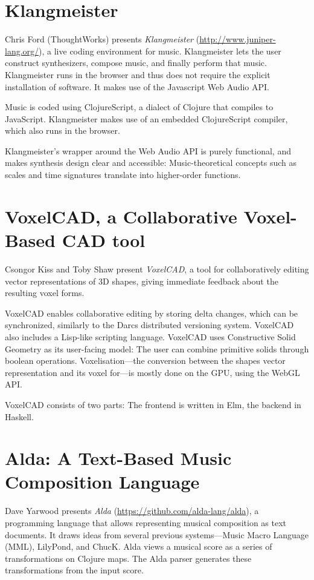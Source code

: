\documentclass{sigplanconf}
\begin{document}
\section{Klangmeister}

Chris Ford (ThoughtWorks) presents \textit{Klangmeister} (\url{http://www.juniper-lang.org/}), a live
coding environment for music.  Klangmeister lets the user construct
synthesizers, compose music, and finally perform that music.
Klangmeister runs in the browser and thus does not require the
explicit installation of software.  It makes use of the Javascript Web
Audio API.

Music is coded using ClojureScript, a dialect of Clojure that
compiles to JavaScript.  Klangmeister makes use of 
an embedded ClojureScript compiler, which also runs in the
browser.

Klangmeister's wrapper around the Web Audio API is purely functional,
and makes synthesis design clear and accessible:  Music-theoretical
concepts such as scales and time signatures translate into
higher-order functions.

\section{VoxelCAD, a Collaborative Voxel-Based CAD tool}

Csongor Kiss and Toby Shaw present \textit{VoxelCAD}, a tool for
collaboratively editing vector representations of 3D shapes, giving
immediate feedback about the resulting voxel forms.

VoxelCAD enables collaborative editing by storing delta chan\-ges, which
can be synchronized, similarly to the Darcs distributed versioning
system.  VoxelCAD also includes a Lisp-like scripting language.
VoxelCAD uses Constructive Solid Geometry as its user-facing model:
The user can combine primitive solids through boolean operations.
Voxelisation---the conversion between the shapes vector representation
and its voxel for---is mostly done on the GPU, using the WebGL API.

VoxelCAD consists of two parts: The frontend is written in Elm, the
backend in Haskell.

\section{Alda: A Text-Based Music Composition Language}

Dave Yarwood presents \textit{Alda} (\url{https://github.com/alda-lang/alda}), a programming language that
allows representing musical composition as text documents.  It draws
ideas from several previous systems---Music Macro Language (MML),
LilyPond,  and ChucK.
Alda views a musical score as a series of transformations on Clojure
maps.  The Alda parser generates these transformations from the input
score.
\end{document}
